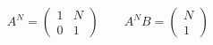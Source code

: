 \documentclass{article}
\begin{document}
\thispagestyle{empty}

$$
A^{N}=\begin{pmatrix} 1 & N \\ 0 & 1\end{pmatrix} \qquad A^N B=\begin{pmatrix}N\\1\end{pmatrix}
$$
\end{document}
